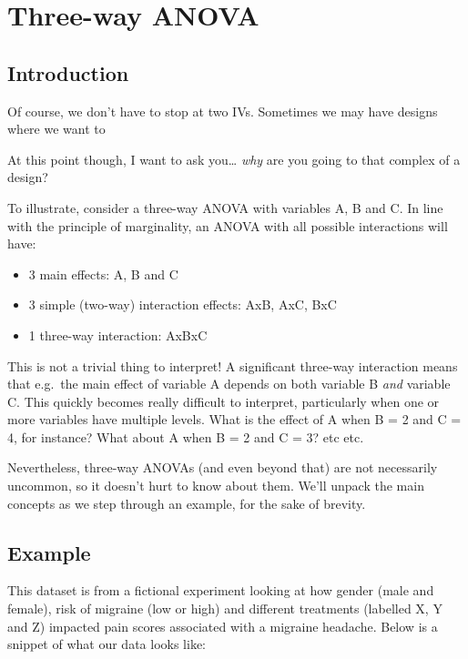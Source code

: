 \documentclass[
]{book}
\providecommand{\tightlist}{%
  \setlength{\itemsep}{0pt}\setlength{\parskip}{0pt}}
\begin{document}
\section{Three-way ANOVA}\label{three-way-anova}

\subsection{Introduction}\label{introduction-3}

Of course, we don't have to stop at two IVs. Sometimes we may have designs where we want to

At this point though, I want to ask you\ldots{} \emph{why} are you going to that complex of a design?

To illustrate, consider a three-way ANOVA with variables A, B and C. In line with the principle of marginality, an ANOVA with all possible interactions will have:

\begin{itemize}
\tightlist
\item
  3 main effects: A, B and C
\item
  3 simple (two-way) interaction effects: AxB, AxC, BxC
\item
  1 three-way interaction: AxBxC
\end{itemize}

This is not a trivial thing to interpret! A significant three-way interaction means that e.g.~the main effect of variable A depends on both variable B \emph{and} variable C. This quickly becomes really difficult to interpret, particularly when one or more variables have multiple levels. What is the effect of A when B = 2 and C = 4, for instance? What about A when B = 2 and C = 3? etc etc.

Nevertheless, three-way ANOVAs (and even beyond that) are not necessarily uncommon, so it doesn't hurt to know about them. We'll unpack the main concepts as we step through an example, for the sake of brevity.

\subsection{Example}\label{example-5}

This dataset is from a fictional experiment looking at how gender (male and female), risk of migraine (low or high) and different treatments (labelled X, Y and Z) impacted pain scores associated with a migraine headache. Below is a snippet of what our data looks like:
\end{document}
